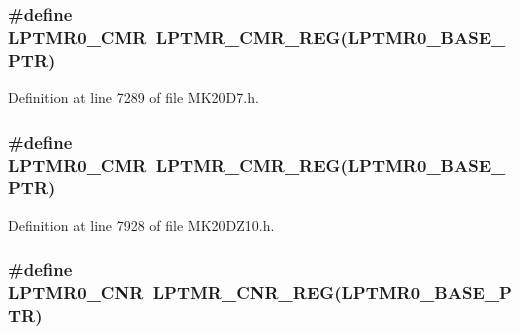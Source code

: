 \subsubsection[{\texorpdfstring{L\+P\+T\+M\+R0\+\_\+\+C\+MR}{LPTMR0_CMR}}]{\setlength{\rightskip}{0pt plus 5cm}\#define L\+P\+T\+M\+R0\+\_\+\+C\+MR~{\bf L\+P\+T\+M\+R\+\_\+\+C\+M\+R\+\_\+\+R\+EG}({\bf L\+P\+T\+M\+R0\+\_\+\+B\+A\+S\+E\+\_\+\+P\+TR})}\hypertarget{group___l_p_t_m_r___register___accessor___macros_gac109508795b1b22820940313ddb4c620}{}\label{group___l_p_t_m_r___register___accessor___macros_gac109508795b1b22820940313ddb4c620}


Definition at line 7289 of file M\+K20\+D7.\+h.

\subsubsection[{\texorpdfstring{L\+P\+T\+M\+R0\+\_\+\+C\+MR}{LPTMR0_CMR}}]{\setlength{\rightskip}{0pt plus 5cm}\#define L\+P\+T\+M\+R0\+\_\+\+C\+MR~{\bf L\+P\+T\+M\+R\+\_\+\+C\+M\+R\+\_\+\+R\+EG}({\bf L\+P\+T\+M\+R0\+\_\+\+B\+A\+S\+E\+\_\+\+P\+TR})}\hypertarget{group___l_p_t_m_r___register___accessor___macros_gac109508795b1b22820940313ddb4c620}{}\label{group___l_p_t_m_r___register___accessor___macros_gac109508795b1b22820940313ddb4c620}


Definition at line 7928 of file M\+K20\+D\+Z10.\+h.

\subsubsection[{\texorpdfstring{L\+P\+T\+M\+R0\+\_\+\+C\+NR}{LPTMR0_CNR}}]{\setlength{\rightskip}{0pt plus 5cm}\#define L\+P\+T\+M\+R0\+\_\+\+C\+NR~{\bf L\+P\+T\+M\+R\+\_\+\+C\+N\+R\+\_\+\+R\+EG}({\bf L\+P\+T\+M\+R0\+\_\+\+B\+A\+S\+E\+\_\+\+P\+TR})}\hypertarget{group___l_p_t_m_r___register___accessor___macros_gada9bf6b3d564321571ac27faa4d263ad}{}\label{group___l_p_t_m_r___register___accessor___macros_gada9bf6b3d564321571ac27faa4d263ad}


